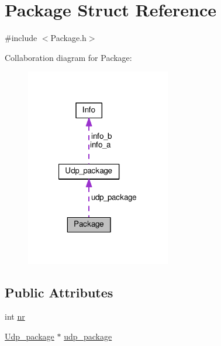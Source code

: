 \hypertarget{structPackage}{\section{Package Struct Reference}
\label{structPackage}
}


{\ttfamily \#include $<$Package.\-h$>$}



Collaboration diagram for Package\-:
\nopagebreak
\begin{figure}[H]
\begin{center}
\leavevmode
\includegraphics[width=179pt]{structPackage__coll__graph}
\end{center}
\end{figure}
\subsection*{Public Attributes}
\begin{DoxyCompactItemize}
\item 
int \hyperlink{structPackage_a562eb146b1c09eb1a819e2b36a64ecc3}{nr}
\item 
\hyperlink{structUdp__package}{Udp\-\_\-package} $\ast$ \hyperlink{structPackage_af73983d5bf7c911c68c9f74639d5f860}{udp\-\_\-package}
\end{DoxyCompactItemize}


